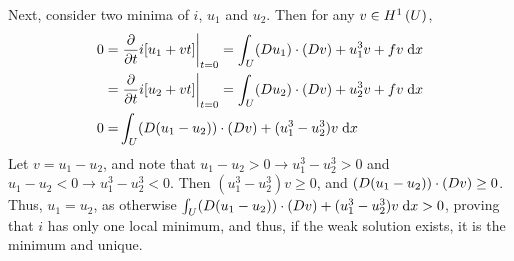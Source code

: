 Next, consider two minima of $i$, $u_1$ and $u_2$.
Then for any $v \in H^{1}\left(U \right)$,
\begin{align*}
  0 = &\left. \frac{\partial }{\partial t} i[u_1 + v t] \right\rvert_{t = 0}
    = \int_U (D u_1) \cdot (D v) + u_1^3 v + f v \;\mathrm{d}x\\
    = &\left. \frac{\partial }{\partial t} i[u_2 + v t] \right\rvert_{t = 0}
    = \int_U (D u_2) \cdot (D v) + u_2^3 v + f v \;\mathrm{d}x\\
  0 = &\int_U (D (u_1 - u_2)) \cdot (D v) + (u_1^3 - u_2^3) v \;\mathrm{d}x
\end{align*}
Let $v = u_1 - u_2$, and note that $u_1 - u_2 > 0 \rightarrow u_1^3 - u_2^3 > 0$
and $u_1 - u_2 < 0 \rightarrow u_1^3 - u_2^3 < 0$.
Then $(u_1^3 - u_2^3) v \geq 0$, and $(D (u_1 - u_2)) \cdot (D v) \geq 0$.
Thus, $u_1 = u_2$, as otherwise
$\int_U (D (u_1 - u_2)) \cdot (D v) + (u_1^3 - u_2^3) v \;\mathrm{d}x > 0$,
proving that $i$ has only one local minimum, and thus,
if the weak solution exists, it is the minimum and unique.

